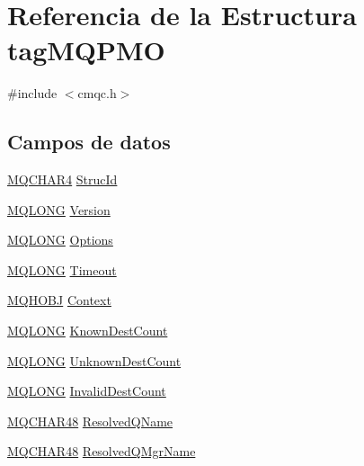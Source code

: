\hypertarget{structtag_m_q_p_m_o}{}\section{Referencia de la Estructura tag\+M\+Q\+P\+M\+O}
\label{structtag_m_q_p_m_o}


{\ttfamily \#include $<$cmqc.\+h$>$}

\subsection*{Campos de datos}
\begin{DoxyCompactItemize}
\item 
\hyperlink{cmqc_8h_a12590e546ed66fda7cf21c1d5cefa31d}{M\+Q\+C\+H\+A\+R4} \hyperlink{structtag_m_q_p_m_o_a0530922ca944569b52601d74941f96e4}{Struc\+Id}
\item 
\hyperlink{cmqc_8h_a1fb8d28cbda3fa8766a9821230cdb6d5}{M\+Q\+L\+O\+N\+G} \hyperlink{structtag_m_q_p_m_o_a0656ef8f766b3907d394d88a35d7b7e9}{Version}
\item 
\hyperlink{cmqc_8h_a1fb8d28cbda3fa8766a9821230cdb6d5}{M\+Q\+L\+O\+N\+G} \hyperlink{structtag_m_q_p_m_o_ad7aff2d6c6044809464380998d24ec5c}{Options}
\item 
\hyperlink{cmqc_8h_a1fb8d28cbda3fa8766a9821230cdb6d5}{M\+Q\+L\+O\+N\+G} \hyperlink{structtag_m_q_p_m_o_a9a46af4b5b34638a690924bb9709c5ba}{Timeout}
\item 
\hyperlink{cmqc_8h_ac093f559f81163292e6016c68c947164}{M\+Q\+H\+O\+B\+J} \hyperlink{structtag_m_q_p_m_o_aa4e5a2da2b7009e9a1cb3afa41140718}{Context}
\item 
\hyperlink{cmqc_8h_a1fb8d28cbda3fa8766a9821230cdb6d5}{M\+Q\+L\+O\+N\+G} \hyperlink{structtag_m_q_p_m_o_ab63679527a2a808aa8c189eeca5d0712}{Known\+Dest\+Count}
\item 
\hyperlink{cmqc_8h_a1fb8d28cbda3fa8766a9821230cdb6d5}{M\+Q\+L\+O\+N\+G} \hyperlink{structtag_m_q_p_m_o_a6443c93f9930aa26f661e00e631a32ea}{Unknown\+Dest\+Count}
\item 
\hyperlink{cmqc_8h_a1fb8d28cbda3fa8766a9821230cdb6d5}{M\+Q\+L\+O\+N\+G} \hyperlink{structtag_m_q_p_m_o_af76c4c4a710793e086829eac1c995d36}{Invalid\+Dest\+Count}
\item 
\hyperlink{cmqc_8h_a53b1a2836da03f19144836725ff77919}{M\+Q\+C\+H\+A\+R48} \hyperlink{structtag_m_q_p_m_o_aec4a06d696b4370f0c86b129d9f868ca}{Resolved\+Q\+Name}
\item 
\hyperlink{cmqc_8h_a53b1a2836da03f19144836725ff77919}{M\+Q\+C\+H\+A\+R48} \hyperlink{structtag_m_q_p_m_o_af36c1b6e6f3f92e0c733c43da9fada3f}{Resolved\+Q\+Mgr\+Name}

\end{DoxyCompactItemize}

